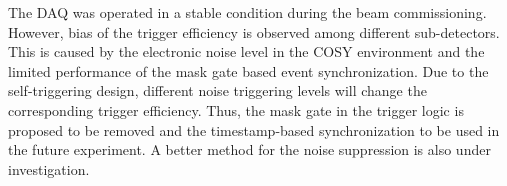 \documentclass[number,5p]{elsarticle}
\begin{document}
The DAQ was operated in a stable condition during the beam commissioning.
However, bias of the trigger efficiency is observed among different sub-detectors.
This is caused by the electronic noise level in the COSY environment
and the limited performance of the mask gate based event synchronization.
Due to the self-triggering design, different noise triggering levels will change the corresponding trigger efficiency.
Thus, the mask gate in the trigger logic is proposed to be removed and the timestamp-based synchronization to be used in the future experiment.
A better method for the noise suppression is also under investigation.



\end{document}
